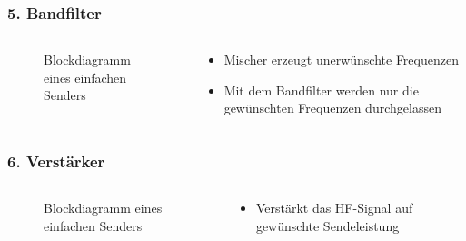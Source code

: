 \begin{frame}
\frametitle{5. Bandfilter}
\begin{columns}
    \begin{column}{0.48\textwidth}
    
\begin{figure}
    \caption{\scriptsize Blockdiagramm eines einfachen Senders}
    \label{aufbau_sender}
\end{figure}


    \end{column}
   \begin{column}{0.48\textwidth}
       \begin{itemize}
  \item Mischer erzeugt unerwünschte Frequenzen
  \item Mit dem Bandfilter werden nur die gewünschten Frequenzen durchgelassen
  \end{itemize}

   \end{column}
\end{columns}

\end{frame}

\begin{frame}
\frametitle{6. Verstärker}
\begin{columns}
    \begin{column}{0.48\textwidth}
    
\begin{figure}
    \caption{\scriptsize Blockdiagramm eines einfachen Senders}
    \label{aufbau_sender}
\end{figure}


    \end{column}
   \begin{column}{0.48\textwidth}
       \begin{itemize}
  \item Verstärkt das HF-Signal auf gewünschte Sendeleistung
  \end{itemize}

   \end{column}
\end{columns}

\end{frame}

